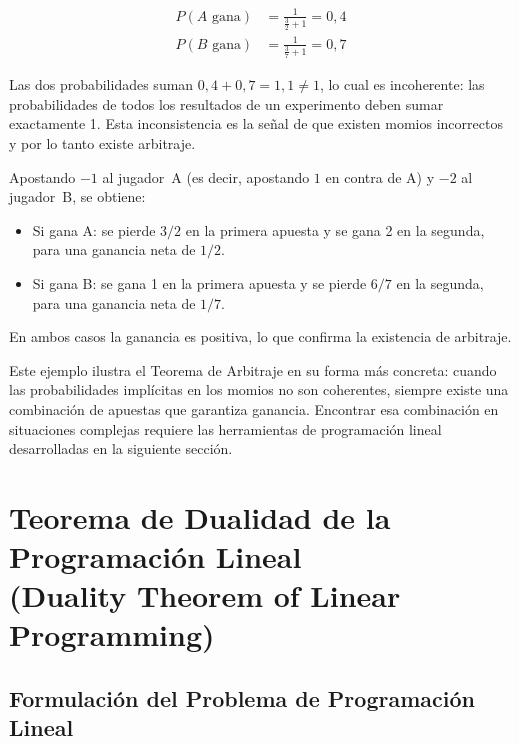\documentclass[12pt]{article}
\begin{document}
\begin{align}
  P(A \text{ gana}) &= \frac{1}{\frac{3}{2}+1} = 0{,}4 \\[4pt]
  P(B \text{ gana}) &= \frac{1}{\frac{3}{7}+1} = 0{,}7
\end{align}

\begin{intuicionmat}
Las dos probabilidades suman $0{,}4 + 0{,}7 = 1{,}1 \neq 1$, lo cual es
incoherente: las probabilidades de todos los resultados de un experimento
deben sumar exactamente 1. Esta inconsistencia es la se\~nal de que existen
momios incorrectos y por lo tanto existe arbitraje.
\end{intuicionmat}

Apostando $-1$ al jugador~A (es decir, apostando $1$ en contra de A) y
$-2$ al jugador~B, se obtiene:
\begin{itemize}
  \item Si gana A: se pierde $3/2$ en la primera apuesta y se gana 2 en la
        segunda, para una ganancia neta de $1/2$.
  \item Si gana B: se gana 1 en la primera apuesta y se pierde $6/7$ en la
        segunda, para una ganancia neta de $1/7$.
\end{itemize}

En ambos casos la ganancia es positiva, lo que confirma la existencia de
arbitraje.

\begin{intuicion}
Este ejemplo ilustra el Teorema de Arbitraje en su forma m\'as concreta:
cuando las probabilidades impl\'icitas en los momios no son coherentes, siempre
existe una combinaci\'on de apuestas que garantiza ganancia. Encontrar esa
combinaci\'on en situaciones complejas requiere las herramientas de
programaci\'on lineal desarrolladas en la siguiente secci\'on.
\end{intuicion}

\section{Teorema de Dualidad de la Programaci\'on Lineal\\
         (Duality Theorem of Linear Programming)}

\subsection{Formulaci\'on del Problema de Programaci\'on Lineal}
\end{document}
